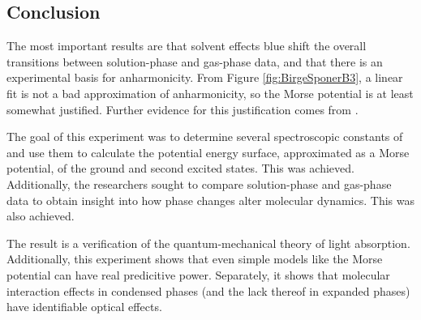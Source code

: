 \documentclass[../labs.tex]{subfiles}
\begin{document}
\subsection*{Conclusion}
The most important results are that solvent effects blue shift the overall transitions between solution-phase and gas-phase data, and that there is an experimental basis for anharmonicity. From Figure \ref{fig:BirgeSponerB3}, a linear fit is not a bad approximation of anharmonicity, so the Morse potential is at least somewhat justified. Further evidence for this justification comes from \textcite{bib:MorseAccuracy}.\par
The goal of this experiment was to determine several spectroscopic constants of  and use them to calculate the potential energy surface, approximated as a Morse potential, of the ground and second excited states. This was achieved. Additionally, the researchers sought to compare solution-phase and gas-phase data to obtain insight into how phase changes alter molecular dynamics. This was also achieved.\par
The result is a verification of the quantum-mechanical theory of light absorption. Additionally, this experiment shows that even simple models like the Morse potential can have real predicitive power. Separately, it shows that molecular interaction effects in condensed phases (and the lack thereof in expanded phases) have identifiable optical effects.
\newpage


\printbibliography
\setcounter{figure}{0}
\setcounter{table}{0}
\end{document}
